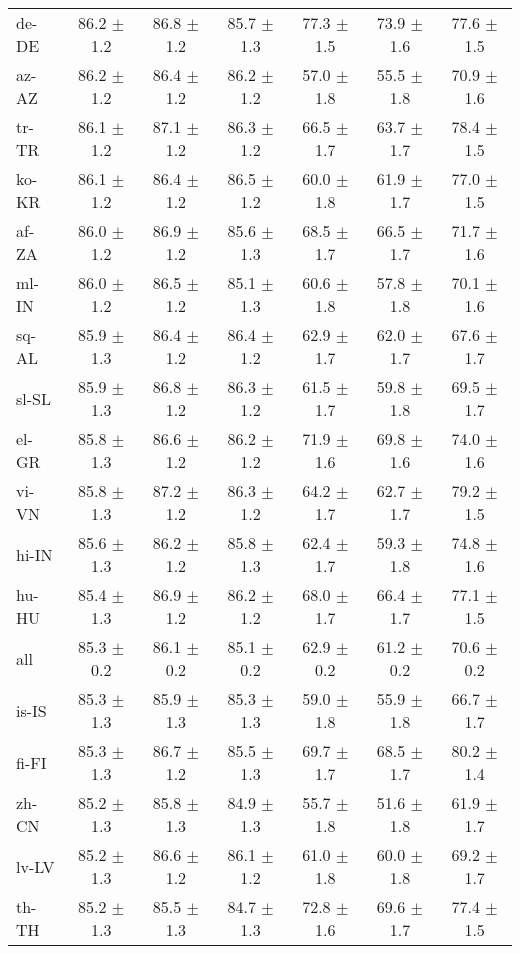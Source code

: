 \documentclass[11pt]{article}
\begin{document}
\begin{table*}[]
{\begin{tabular}{lcccccc}
de-DE & 86.2 $\pm$ 1.2 & 86.8 $\pm$ 1.2 & 85.7 $\pm$ 1.3 & 77.3 $\pm$ 1.5 & 73.9 $\pm$ 1.6 & 77.6 $\pm$ 1.5 \\
az-AZ & 86.2 $\pm$ 1.2 & 86.4 $\pm$ 1.2 & 86.2 $\pm$ 1.2 & 57.0 $\pm$ 1.8 & 55.5 $\pm$ 1.8 & 70.9 $\pm$ 1.6 \\
tr-TR & 86.1 $\pm$ 1.2 & 87.1 $\pm$ 1.2 & 86.3 $\pm$ 1.2 & 66.5 $\pm$ 1.7 & 63.7 $\pm$ 1.7 & 78.4 $\pm$ 1.5 \\
ko-KR & 86.1 $\pm$ 1.2 & 86.4 $\pm$ 1.2 & 86.5 $\pm$ 1.2 & 60.0 $\pm$ 1.8 & 61.9 $\pm$ 1.7 & 77.0 $\pm$ 1.5 \\
af-ZA & 86.0 $\pm$ 1.2 & 86.9 $\pm$ 1.2 & 85.6 $\pm$ 1.3 & 68.5 $\pm$ 1.7 & 66.5 $\pm$ 1.7 & 71.7 $\pm$ 1.6 \\
ml-IN & 86.0 $\pm$ 1.2 & 86.5 $\pm$ 1.2 & 85.1 $\pm$ 1.3 & 60.6 $\pm$ 1.8 & 57.8 $\pm$ 1.8 & 70.1 $\pm$ 1.6 \\
sq-AL & 85.9 $\pm$ 1.3 & 86.4 $\pm$ 1.2 & 86.4 $\pm$ 1.2 & 62.9 $\pm$ 1.7 & 62.0 $\pm$ 1.7 & 67.6 $\pm$ 1.7 \\
sl-SL & 85.9 $\pm$ 1.3 & 86.8 $\pm$ 1.2 & 86.3 $\pm$ 1.2 & 61.5 $\pm$ 1.7 & 59.8 $\pm$ 1.8 & 69.5 $\pm$ 1.7 \\
el-GR & 85.8 $\pm$ 1.3 & 86.6 $\pm$ 1.2 & 86.2 $\pm$ 1.2 & 71.9 $\pm$ 1.6 & 69.8 $\pm$ 1.6 & 74.0 $\pm$ 1.6 \\
vi-VN & 85.8 $\pm$ 1.3 & 87.2 $\pm$ 1.2 & 86.3 $\pm$ 1.2 & 64.2 $\pm$ 1.7 & 62.7 $\pm$ 1.7 & 79.2 $\pm$ 1.5 \\
hi-IN & 85.6 $\pm$ 1.3 & 86.2 $\pm$ 1.2 & 85.8 $\pm$ 1.3 & 62.4 $\pm$ 1.7 & 59.3 $\pm$ 1.8 & 74.8 $\pm$ 1.6 \\
hu-HU & 85.4 $\pm$ 1.3 & 86.9 $\pm$ 1.2 & 86.2 $\pm$ 1.2 & 68.0 $\pm$ 1.7 & 66.4 $\pm$ 1.7 & 77.1 $\pm$ 1.5 \\
all & 85.3 $\pm$ 0.2 & 86.1 $\pm$ 0.2 & 85.1 $\pm$ 0.2 & 62.9 $\pm$ 0.2 & 61.2 $\pm$ 0.2 & 70.6 $\pm$ 0.2 \\
is-IS & 85.3 $\pm$ 1.3 & 85.9 $\pm$ 1.3 & 85.3 $\pm$ 1.3 & 59.0 $\pm$ 1.8 & 55.9 $\pm$ 1.8 & 66.7 $\pm$ 1.7 \\
fi-FI & 85.3 $\pm$ 1.3 & 86.7 $\pm$ 1.2 & 85.5 $\pm$ 1.3 & 69.7 $\pm$ 1.7 & 68.5 $\pm$ 1.7 & 80.2 $\pm$ 1.4 \\
zh-CN & 85.2 $\pm$ 1.3 & 85.8 $\pm$ 1.3 & 84.9 $\pm$ 1.3 & 55.7 $\pm$ 1.8 & 51.6 $\pm$ 1.8 & 61.9 $\pm$ 1.7 \\
lv-LV & 85.2 $\pm$ 1.3 & 86.6 $\pm$ 1.2 & 86.1 $\pm$ 1.2 & 61.0 $\pm$ 1.8 & 60.0 $\pm$ 1.8 & 69.2 $\pm$ 1.7 \\
th-TH & 85.2 $\pm$ 1.3 & 85.5 $\pm$ 1.3 & 84.7 $\pm$ 1.3 & 72.8 $\pm$ 1.6 & 69.6 $\pm$ 1.7 & 77.4 $\pm$ 1.5 \\

\end{tabular}}
\end{table*}
\end{document}
